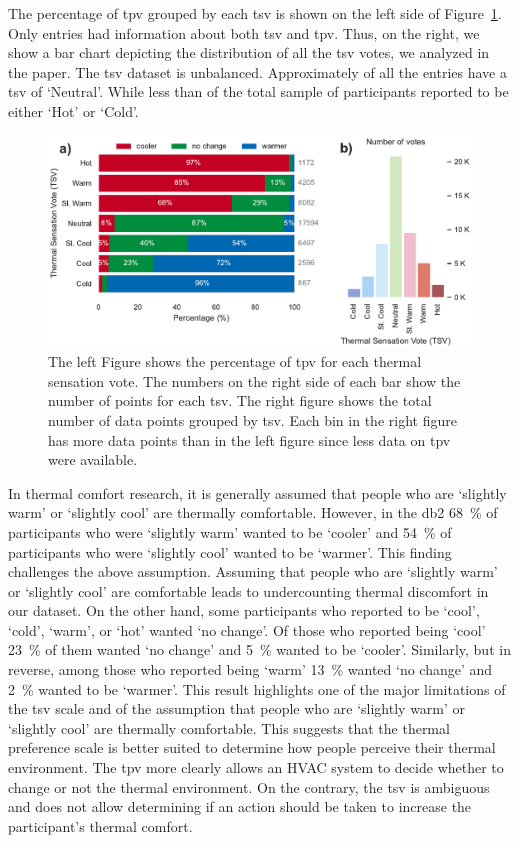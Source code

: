 The percentage of \ac{tpv} grouped by each \ac{tsv} is shown on the left side of Figure~\ref{fig:bar_plot_tp_by_ts}.
Only  entries had information about both \ac{tsv} and \ac{tpv}.
Thus, on the right, we show a bar chart depicting the distribution of all the \ac{tsv} votes, we analyzed in the paper.
The \ac{tsv} dataset is unbalanced.
Approximately  of all the entries have a \ac{tsv} of `Neutral'.
While less than  of the total sample of participants reported to be either `Hot' or `Cold'.
\begin{figure}[htb!]
    \centering
    \includegraphics[width=\textwidth]{figures/bar_plot_tp_by_ts}
    \caption{The left Figure shows the percentage of \ac{tpv} for each thermal sensation vote.
    The numbers on the right side of each bar show the number of points for each \ac{tsv}.
    The right figure shows the total number of data points grouped by \ac{tsv}.
    Each bin in the right figure has more data points than in the left figure since less data on \ac{tpv} were available.}
    \label{fig:bar_plot_tp_by_ts}
\end{figure}

In thermal comfort research, it is generally assumed that people who are `slightly warm' or `slightly cool' are thermally comfortable.
However, in the \ac{db2} \qty{68}{\percent} of participants who were `slightly warm' wanted to be `cooler' and \qty{54}{\percent} of participants who were `slightly cool' wanted to be `warmer'.
This finding challenges the above assumption.
Assuming that people who are `slightly warm' or `slightly cool' are comfortable leads to undercounting thermal discomfort in our dataset.
On the other hand, some participants who reported to be `cool', `cold', `warm', or `hot' wanted `no change'.
Of those who reported being `cool' \qty{23}{\percent} of them wanted `no change' and \qty{5}{\percent} wanted to be `cooler'.
Similarly, but in reverse, among those who reported being `warm' \qty{13}{\percent} wanted `no change' and \qty{2}{\percent} wanted to be `warmer'.
This result highlights one of the major limitations of the \ac{tsv} scale and of the assumption that people who are `slightly warm' or `slightly cool' are thermally comfortable.
This suggests that the thermal preference scale is better suited to determine how people perceive their thermal environment.
The \ac{tpv} more clearly allows an HVAC system to decide whether to change or not the thermal environment.
On the contrary, the \ac{tsv} is ambiguous and does not allow determining if an action should be taken to increase the participant's thermal comfort.

